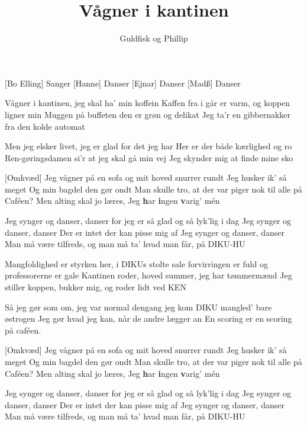 \documentclass[a4paper,11pt]{article}
\title{Vågner i kantinen}
\author{Guldfisk og Phillip}
\begin{document}
\maketitle

\begin{roles}  
[Bo Elling] Sanger
[Hanne] Danser
[Ejnar] Danser
[Madß] Danser
\end{roles}

\begin{song}

 Vågner i kantinen, jeg skal ha' min koffein
Kaffen fra i går er varm, og koppen ligner min
Muggen på buffeten den er grøn og delikat
Jeg ta'r en gibbernakker fra den kolde automat

Men jeg elsker livet, jeg er glad for det jeg har
Her er der både kærlighed og ro
Ren-gøringsdamen si'r at jeg skal gå min vej
Jeg skynder mig at finde mine sko


[Omkvæd] Jeg vågner på en sofa
og mit hoved snurrer rundt
Jeg husker ik' så meget
Og min bagdel den gør ondt
Man skulle tro, at der var piger nok til alle på Caféen?
Men alting skal jo læres,
Jeg \textbf{h}ar \textbf{i}ngen \textbf{v}arig' mén

Jeg synger og danser, danser
for jeg er så glad og så lyk'lig i dag
Jeg synger og danser, danser
Der er intet der kan pisse mig af
Jeg synger og danser, danser
Man må være tilfreds, og man må ta' hvad man får, på DIKU-HU


 Mangfoldighed er styrken her, i DIKUs stolte sale
forvirringen er fuld og professorerne er gale
Kantinen roder, hoved summer, jeg har tømmermænd
Jeg stiller koppen, bukker mig, og roder lidt ved KEN

Så jeg gør som om, jeg var normal dengang jeg kom
DIKU mangled' bare østrogen
Jeg gør hvad jeg kan, når de andre lægger an 
En scoring er en scoring på caféen.


[Omkvæd] Jeg vågner på en sofa
og mit hoved snurrer rundt
Jeg husker ik' så meget
Og min bagdel den gør ondt
Man skulle tro, at der var piger nok til alle på Caféen?
Men alting skal jo læres,
Jeg \textbf{h}ar \textbf{i}ngen \textbf{v}arig' mén

Jeg synger og danser, danser
for jeg er så glad og så lyk'lig i dag
Jeg synger og danser, danser
Der er intet der kan pisse mig af
Jeg synger og danser, danser
Man må være tilfreds, og man må ta' hvad man får, på DIKU-HU



\end{song}
\end{document}
